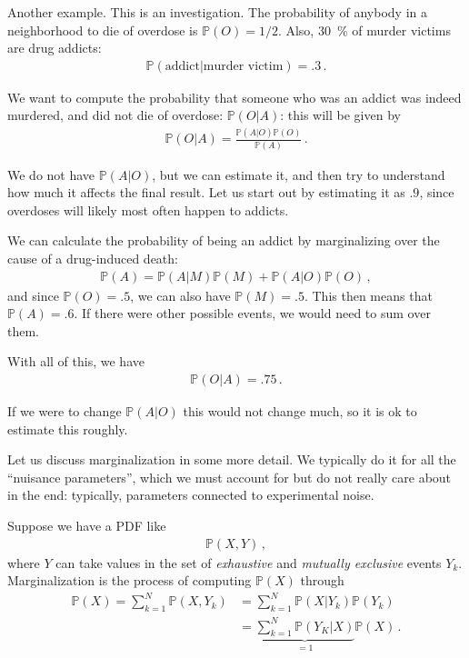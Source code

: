 \documentclass[main.tex]{subfiles}
\begin{document}
Another example. This is an investigation. The probability of anybody in a neighborhood to die of overdose is \(\mathbb{P}(O) = 1/2\). 
Also, \SI{30}{\percent} of murder victims are drug addicts: 
%
\begin{align}
\mathbb{P}(\text{addict} | \text{murder victim}) = \num{.3}
\,.
\end{align}

We want to compute the probability that someone who was an addict was indeed murdered, and did not die of overdose: \(\mathbb{P}(O | A)\): this will be given by 
%
\begin{align}
\mathbb{P}(O | A) =\frac{\mathbb{P}(A | O) \mathbb{P}(O)}{\mathbb{P}(A)}
\,.
\end{align}

We do not have \(\mathbb{P}(A | O)\), but we can estimate it, and then try to understand how much it affects the final result. Let us start out by estimating it as \(\num{.9}\), since overdoses will likely most often happen to addicts. 

We can calculate the probability of being an addict by marginalizing over the cause of a drug-induced death:
%
\begin{align}
\mathbb{P}(A) =
\mathbb{P}(A | M) \mathbb{P}(M) 
+ \mathbb{P}(A | O) \mathbb{P}(O)
\,,
\end{align}
%
and since \(\mathbb{P}(O) = \num{.5}\), we can also have \(\mathbb{P}(M)= \num{.5}\). 
This then means that \(\mathbb{P}(A) = \num{.6}\).
If there were other possible events, we would need to sum over them.

With all of this, we have 
%
\begin{align}
\mathbb{P}(O | A) = \num{.75} 
\,.
\end{align}

If we were to change \(\mathbb{P}(A | O)\) this would not change much, so it is ok to estimate this roughly.

Let us discuss marginalization in some more detail.
We typically do it for all the ``nuisance parameters'', which we must account for but do not really care about in the end: typically, parameters connected to experimental noise. 

Suppose we have a PDF like 
%
\begin{align}
\mathbb{P}(X, Y)
\,,
\end{align}
%
where \(Y\) can take values in the set of \emph{exhaustive} and \emph{mutually exclusive} events \(Y_k\). 
Marginalization is the process of computing \(\mathbb{P}(X)\) through
%
\begin{align}
\mathbb{P}(X) 
= \sum _{k=1}^{N} \mathbb{P}(X, Y_k)
&= \sum _{k=1}^{N} \mathbb{P}(X | Y_k) \mathbb{P}(Y_k)  \\
&= \underbrace{\sum _{k=1}^{N} \mathbb{P}(Y_K | X)}_{= 1} \mathbb{P}(X)
\,.
\end{align}
\end{document}
